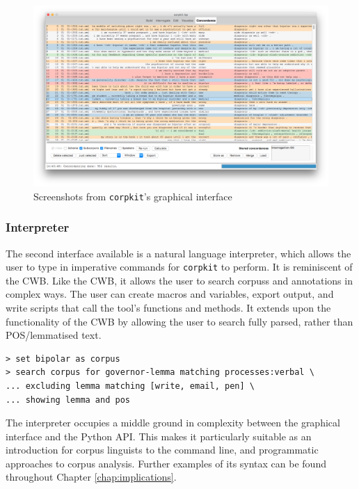 \begin{figure}[htb]
\begin{minipage}[b]{0.5\linewidth}
    \vspace{1ex}
  \end{minipage}%
  \begin{minipage}[b]{0.5\linewidth}
    \centering
    \includegraphics[width=.98\linewidth]{../images/conco} 
    
    \vspace{1ex}
  \end{minipage} 
  \caption{Screenshots from \texttt{corpkit}'s graphical interface}
  \label{fig:gui-screenshots} 
\end{figure}

\subsubsection{Interpreter}

The second interface available is a natural language interpreter, which allows the user to type in imperative commands for \texttt{corpkit} to perform. It is reminiscent of the \gls{CWB}. Like the \gls{CWB}, it allows the user to search \glspl{corpus} and annotations in complex ways. The user can create macros and variables, export output, and write scripts that call the tool's functions and methods. It extends upon the functionality of the \gls{CWB} by allowing the user to search fully parsed, rather than \gls{POS}\slash lemmatised text.

\begin{verbatim}
> set bipolar as corpus
> search corpus for governor-lemma matching processes:verbal \
... excluding lemma matching [write, email, pen] \
... showing lemma and pos
\end{verbatim}
%
\noindent The interpreter occupies a middle ground in complexity between the graphical interface and the Python \gls{API}. This makes it particularly suitable as an introduction for corpus linguists to the command line, and programmatic approaches to corpus analysis. Further examples of its syntax can be found throughout Chapter \ref{chap:implications}.


